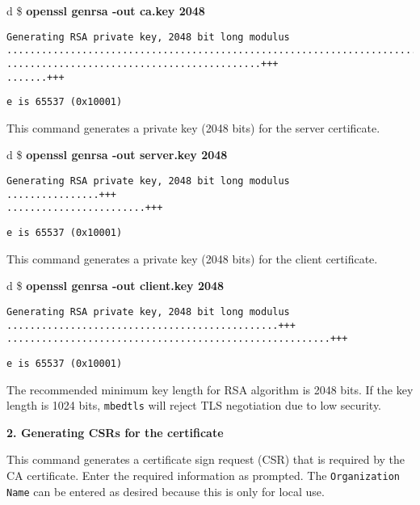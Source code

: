 \documentclass[a4paper,12pt]{book}
\begin{document}
\begin{codebloc}
\begin{tabular}{d}
\$ \textbf{openssl genrsa -out ca.key 2048}
\begin{verbatim}
Generating RSA private key, 2048 bit long modulus
...............................................................................
............................................+++
.......+++
\end{verbatim}
\verb|e is 65537 (0x10001)|
\end{tabular}
\end{codebloc}

This command generates a private key (2048 bits) for the server certificate.

\begin{codebloc}
\begin{tabular}{d}
\$ \textbf{openssl genrsa -out server.key 2048}
\begin{verbatim}
Generating RSA private key, 2048 bit long modulus
................+++
........................+++
\end{verbatim}
\verb|e is 65537 (0x10001)|
\end{tabular}
\end{codebloc}

This command generates a private key (2048 bits) for the client certificate.

\begin{codebloc}
\begin{tabular}{d}
\$ \textbf{openssl genrsa -out client.key 2048}
\begin{verbatim}
Generating RSA private key, 2048 bit long modulus
...............................................+++
........................................................+++
\end{verbatim}
\verb|e is 65537 (0x10001)|
\end{tabular}
\end{codebloc}

The recommended minimum key length for RSA algorithm is 2048 bits. If the key length is 1024 bits, \verb|mbedtls| will reject TLS negotiation due to low security.

\textbf{2. Generating CSRs for the certificate}

This command generates a certificate sign request (CSR) that is required by the CA certificate. Enter the required information as prompted. The \verb|Organization Name| can be entered as desired because this is only for local use.
\end{document}
